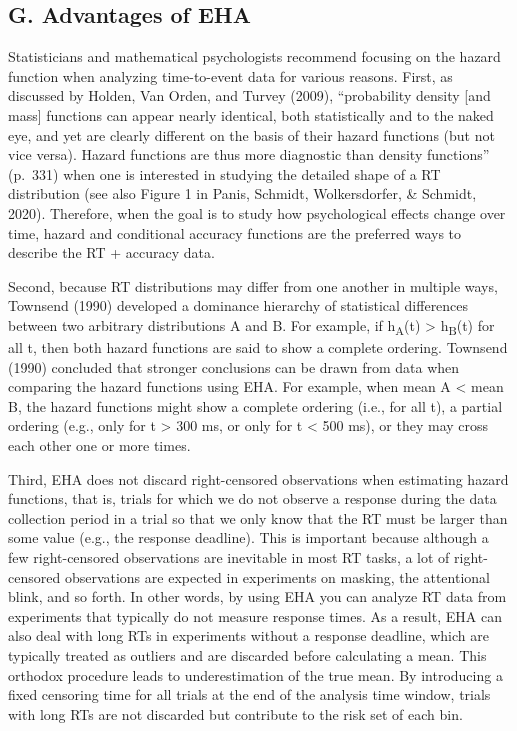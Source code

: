 \documentclass[
  man,floatsintext]{apa6}
\begin{document}
\subsection{G. Advantages of EHA}\label{g.-advantages-of-eha}

Statisticians and mathematical psychologists recommend focusing on the hazard function when analyzing time-to-event data for various reasons. First, as discussed by Holden, Van Orden, and Turvey (2009), ``probability density {[}and mass{]} functions can appear nearly identical, both statistically and to the naked eye, and yet are clearly different on the basis of their hazard functions (but not vice versa). Hazard functions are thus more diagnostic than density functions'' (p.~331) when one is interested in studying the detailed shape of a RT distribution (see also Figure 1 in Panis, Schmidt, Wolkersdorfer, \& Schmidt, 2020). Therefore, when the goal is to study how psychological effects change over time, hazard and conditional accuracy functions are the preferred ways to describe the RT + accuracy data.

Second, because RT distributions may differ from one another in multiple ways, Townsend (1990) developed a dominance hierarchy of statistical differences between two arbitrary distributions A and B. For example, if h\textsubscript{A}(t) \textgreater{} h\textsubscript{B}(t) for all t, then both hazard functions are said to show a complete ordering. Townsend (1990) concluded that stronger conclusions can be drawn from data when comparing the hazard functions using EHA. For example, when mean A \textless{} mean B, the hazard functions might show a complete ordering (i.e., for all t), a partial ordering (e.g., only for t \textgreater{} 300 ms, or only for t \textless{} 500 ms), or they may cross each other one or more times.

Third, EHA does not discard right-censored observations when estimating hazard functions, that is, trials for which we do not observe a response during the data collection period in a trial so that we only know that the RT must be larger than some value (e.g., the response deadline). This is important because although a few right-censored observations are inevitable in most RT tasks, a lot of right-censored observations are expected in experiments on masking, the attentional blink, and so forth. In other words, by using EHA you can analyze RT data from experiments that typically do not measure response times. As a result, EHA can also deal with long RTs in experiments without a response deadline, which are typically treated as outliers and are discarded before calculating a mean. This orthodox procedure leads to underestimation of the true mean. By introducing a fixed censoring time for all trials at the end of the analysis time window, trials with long RTs are not discarded but contribute to the risk set of each bin.
\end{document}
